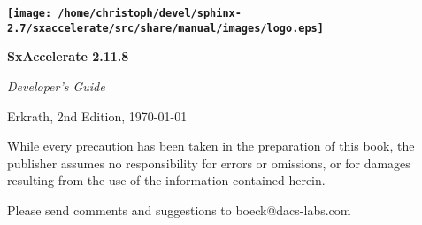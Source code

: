 \thispagestyle{empty}\vspace*{.5\textheight}


\begin{flushright}
\textbf{\Huge \texttt{[image: /home/christoph/devel/sphinx-2.7/sxaccelerate/src/share/manual/images/logo.eps]}}
\par\end{flushright}{\Huge \par}

\begin{flushright}
\textbf{\Huge SxAccelerate 2.11.8}
\par\end{flushright}{\Huge \par}

\begin{flushright}
{\Huge \hrulefill}
\par\end{flushright}{\Huge \par}

\begin{flushright}
\emph{\Huge Developer's Guide}
\par\end{flushright}{\Huge \par}

\newpage{}

\textbf{\Huge \thispagestyle{empty}}{\Huge \par}

{\small Erkrath, 2nd Edition, \today}{\small \par}

\vspace*{0.8\textheight}
While every precaution has been taken in the preparation of this book,
the publisher assumes no responsibility for errors or omissions, or
for damages resulting from the use of the information contained herein.
\vspace{1em}

Please send comments and suggestions to boeck@dacs-labs.com\newpage{}
